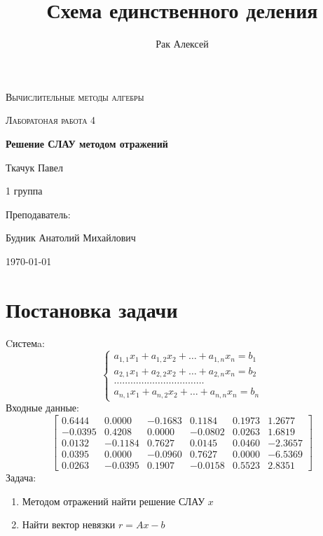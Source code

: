 \documentclass[11.4pt]{article}
\author{Рак Алексей}
\title{Схема единственного деления}
\begin{document}
	\begin{titlepage}
		\centering
		{\scshape\LARGE Вычислительные методы алгебры \par}
		\vfill
		{\scshape\Large Лаборатоная работа 4 \par}
		\vspace{1cm}
		{\huge\bfseries Решение СЛАУ методом отражений\par}
		\vspace{10cm}
		\begin{flushright}
		Ткачук Павел\par
		1 группа \par
		\vspace{0.5cm}
		Преподаватель:\par
		Будник Анатолий Михайлович
		\end{flushright}
		
		\vfill
		{\large \today}
	\end{titlepage}
\section{Постановка задачи}
	Cистемa:
	\begin{equation}
		\left\{
			\begin{array}{c}
				a_{1,1} x_1 + a_{1,2} x_2 + \ldots + a_{1,n} x_n = b_1  \\
				a_{2,1} x_1 + a_{2,2} x_2 + \ldots + a_{2,n} x_n = b_2  \\
				\dots\dots\dots\dots\dots\dots\dots\dots\dots\dots\dots  \\
				a_{n,1} x_1 + a_{n,2} x_2 + \ldots + a_{n,n} x_n = b_n  
			\end{array}
		\right.
	\end{equation}
	Входные данные:
	\[
		\left[
			\begin{array}{ccccc|c}
				0.6444 & 0.0000 & -0.1683 & 0.1184 & 0.1973 & 1.2677\\
				-0.0395 & 0.4208 & 0.0000 & -0.0802 & 0.0263 & 1.6819\\
				0.0132  & -0.1184 & 0.7627 & 0.0145 & 0.0460 & -2.3657\\
				0.0395 & 0.0000 & -0.0960 & 0.7627 & 0.0000 & -6.5369\\
				0.0263 & -0.0395 & 0.1907 & -0.0158 & 0.5523 & 2.8351
			\end{array}
		\right]
	\]
	Задача:
	\begin{enumerate}
		\item Методом отражений найти решение СЛАУ $x$
		\item Найти вектор невязки $r = Ax-b$
	\end{enumerate}
\end{document}
